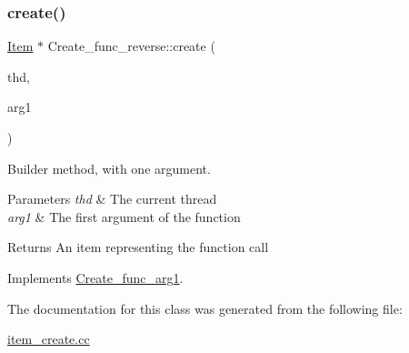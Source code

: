 \subsubsection{\texorpdfstring{create()}{create()}}
{\footnotesize\ttfamily \mbox{\hyperlink{classItem}{Item}} $\ast$ Create\+\_\+func\+\_\+reverse\+::create (\begin{DoxyParamCaption}\item[{T\+HD $\ast$}]{thd,  }\item[{\mbox{\hyperlink{classItem}{Item}} $\ast$}]{arg1 }\end{DoxyParamCaption})\hspace{0.3cm}{\ttfamily [virtual]}}

Builder method, with one argument. 
\begin{DoxyParams}{Parameters}
{\em thd} & The current thread \\
\hline
{\em arg1} & The first argument of the function \\
\hline
\end{DoxyParams}
\begin{DoxyReturn}{Returns}
An item representing the function call 
\end{DoxyReturn}


Implements \mbox{\hyperlink{classCreate__func__arg1_a3e9a98f755cd82c3e762e334c955a8c9}{Create\+\_\+func\+\_\+arg1}}.



The documentation for this class was generated from the following file\+:\begin{DoxyCompactItemize}
\item 
\mbox{\hyperlink{item__create_8cc}{item\+\_\+create.\+cc}}\end{DoxyCompactItemize}
